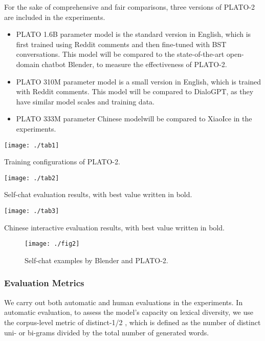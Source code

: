 \documentclass[11pt,a4paper]{article}
\begin{document}
	For the sake of comprehensive and fair comparisons, three versions of PLATO-2 are included in the experiments.
	\begin{itemize}[leftmargin=*,noitemsep,topsep=0pt]
		\item PLATO 1.6B parameter model is the standard version in English, which is first trained using Reddit comments and then fine-tuned with BST conversations. This model will be compared to the state-of-the-art open-domain chatbot Blender, to measure the effectiveness of PLATO-2.
		
		\item PLATO 310M parameter model is a small version in English, which is trained with Reddit comments. This model will be compared to DialoGPT, as they have similar model scales and training data.
		
		\item PLATO 333M parameter Chinese model\footnotemark[2] will be compared to XiaoIce in the experiments.
	\end{itemize}
	
	\begin{table*}[ht]
		\centering
		\texttt{[image: ./tab1]}
		\caption{Training configurations of PLATO-2.}
		\label{tab:training}
	\end{table*} 
	
	\begin{table*}[ht]
		\centering
		\texttt{[image: ./tab2]}
		\caption{Self-chat evaluation results, with best value written in bold.}
		\label{tab:self-chat}
	\end{table*} 
	
	\begin{table*}[ht]
		\centering
		\texttt{[image: ./tab3]}
		\caption{Chinese interactive evaluation results, with best value written in bold.}
		\label{tab:interactive}
	\end{table*} 
	
	\begin{figure*}[ht]
		\centering
		\texttt{[image: ./fig2]}
		\caption{Self-chat examples by Blender and PLATO-2.}
		\label{fig:case}
	\end{figure*} 
	
	\subsubsection{Evaluation Metrics}
	We carry out both automatic and human evaluations in the experiments. In automatic evaluation, to assess the model's capacity on lexical diversity, we use the corpus-level metric of distinct-1/2 \cite{li2016diversity}, which is defined as the number of distinct uni- or bi-grams divided by the total number of generated words.
	
\end{document}
